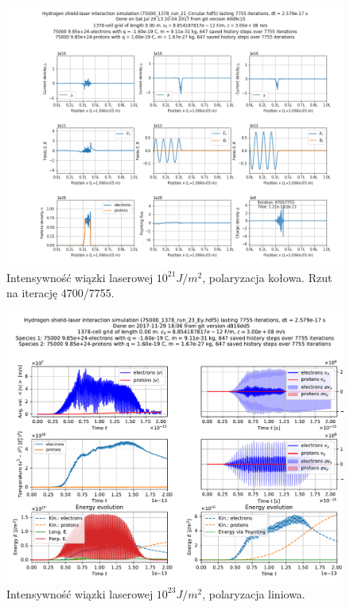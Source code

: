\begin{figure}[h!]
  \includegraphics[width=\textwidth]{Images/75000_1378_run_21_Circular_004700}
  \caption{Intensywność wiązki laserowej $10^{21} J/m^2$, polaryzacja kołowa. Rzut na iterację 4700/7755.\label{fig:laser-21-Circular-snapshot}}
\end{figure}

\begin{figure}[h!]
  \includegraphics[width=\textwidth]{Images/75000_1378_run_23_Ey}
  \caption{Intensywność wiązki laserowej $10^{23} J/m^2$, polaryzacja liniowa.\label{fig:laser-23-Ey}}
\end{figure}


